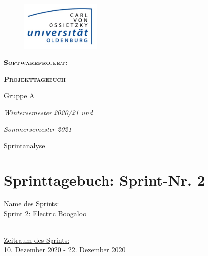 \documentclass[12pt,a4paper, oneside]{article}
\author{Uni Oldenburg, SWP2020 Gruppe A}
\begin{document}
    \begin{titlepage}
        \pagestyle{empty}
        \begin{center}

            \begin{figure}[h]
                \centering
                \includegraphics[width=0.35\textwidth]{../img/Logo.jpg}
            \end{figure}

            \bigskip \bigskip \noindent
            \textsc{\textbf{\LARGE Softwareprojekt:}} \par \bigskip \noindent
            \textsc{\textbf{\LARGE Projekttagebuch}}


            \par \bigskip \bigskip \bigskip \bigskip \bigskip \noindent
            {\Large Gruppe A} \par \medskip \noindent

            \par \bigskip \bigskip \bigskip \bigskip \bigskip \bigskip \noindent
            \textit{\Large Wintersemester 2020/21 und} \par \noindent
            \textit{\Large Sommersemester 2021}

            \par \bigskip \bigskip \bigskip \bigskip \bigskip \bigskip \noindent
            \par \bigskip \bigskip \bigskip \noindent
            {\Large Sprintanalyse} \par \medskip \noindent

        \end{center}
    \end{titlepage}

    \tableofcontents
    \pagebreak


    \section{Sprinttagebuch: Sprint-Nr. 2}
    \underline{Name des Sprints:}
    \\
    Sprint 2: Electric Boogaloo

    \noindent
    \\
    \underline{Zeitraum des Sprints:}
    \\
    10. Dezember 2020 - 22. Dezember 2020
\end{document}
